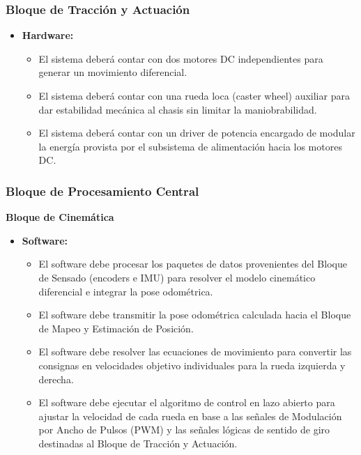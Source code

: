 \documentclass[12pt,a4paper]{article}
\begin{document}
\subsubsection{Bloque de Tracción y Actuación}
\begin{itemize}
    \item \textbf{Hardware:}
    \begin{itemize}
        \item El sistema deberá contar con dos motores DC independientes para generar un movimiento diferencial.
        \item El sistema deberá contar con una rueda loca (caster wheel) auxiliar para dar estabilidad mecánica al chasis sin limitar la maniobrabilidad.
        \item El sistema deberá contar con un driver de potencia encargado de modular la energía provista por el subsistema de alimentación hacia los motores DC.
    \end{itemize}

\end{itemize}

\subsubsection{Bloque de Procesamiento Central}
\noindent\textbf{Bloque de Cinemática}
\begin{itemize}
    \item \textbf{Software:}
    \begin{itemize}
        \item El software debe procesar los paquetes de datos provenientes del Bloque de Sensado (encoders e IMU) para resolver el modelo cinemático diferencial e integrar la pose odométrica.
        \item El software debe transmitir la pose odométrica calculada hacia el Bloque de Mapeo y Estimación de Posición.
        \item El software debe resolver las ecuaciones de movimiento para convertir las consignas en velocidades objetivo individuales para la rueda izquierda y derecha.
        \item El software debe ejecutar el algoritmo de control en lazo abierto para ajustar la velocidad de cada rueda en base a las señales de Modulación por Ancho de Pulsos (PWM) y las señales lógicas de sentido de giro destinadas al Bloque de Tracción y Actuación.
    \end{itemize}
\end{itemize}
\end{document}
